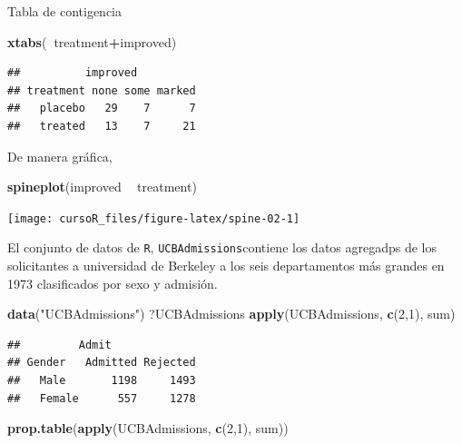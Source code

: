 \documentclass[]{book}
\newenvironment{Shaded}{\begin{snugshade}}{\end{snugshade}}
\newcommand{\KeywordTok}[1]{\textcolor[rgb]{0.13,0.29,0.53}{\textbf{#1}}}
\newcommand{\DecValTok}[1]{\textcolor[rgb]{0.00,0.00,0.81}{#1}}
\newcommand{\StringTok}[1]{\textcolor[rgb]{0.31,0.60,0.02}{#1}}
\newcommand{\OperatorTok}[1]{\textcolor[rgb]{0.81,0.36,0.00}{\textbf{#1}}}
\newcommand{\NormalTok}[1]{#1}
\begin{document}
Tabla de contigencia

\begin{Shaded}
\begin{Highlighting}[]
\KeywordTok{xtabs}\NormalTok{(}\OperatorTok{~}\NormalTok{treatment}\OperatorTok{+}\NormalTok{improved)}
\end{Highlighting}
\end{Shaded}

\begin{verbatim}
##          improved
## treatment none some marked
##   placebo   29    7      7
##   treated   13    7     21
\end{verbatim}

De manera gráfica,

\begin{Shaded}
\begin{Highlighting}[]
\KeywordTok{spineplot}\NormalTok{(improved }\OperatorTok{~}\StringTok{ }\NormalTok{treatment)}
\end{Highlighting}
\end{Shaded}

\begin{center}\texttt{[image: cursoR\_files/figure-latex/spine-02-1]} \end{center}

El conjunto de datos de \texttt{R}, \texttt{UCBAdmissions}contiene los
datos agregadps de los solicitantes a universidad de Berkeley a los seis
departamentos más grandes en 1973 clasificados por sexo y admisión.

\begin{Shaded}
\begin{Highlighting}[]
\KeywordTok{data}\NormalTok{(}\StringTok{"UCBAdmissions"}\NormalTok{)}
\NormalTok{?UCBAdmissions}
\KeywordTok{apply}\NormalTok{(UCBAdmissions, }\KeywordTok{c}\NormalTok{(}\DecValTok{2}\NormalTok{,}\DecValTok{1}\NormalTok{), sum)}
\end{Highlighting}
\end{Shaded}

\begin{verbatim}
##         Admit
## Gender   Admitted Rejected
##   Male       1198     1493
##   Female      557     1278
\end{verbatim}

\begin{Shaded}
\begin{Highlighting}[]
\KeywordTok{prop.table}\NormalTok{(}\KeywordTok{apply}\NormalTok{(UCBAdmissions, }\KeywordTok{c}\NormalTok{(}\DecValTok{2}\NormalTok{,}\DecValTok{1}\NormalTok{), sum))}
\end{Highlighting}
\end{Shaded}
\end{document}
